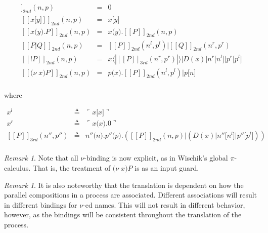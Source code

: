 \documentclass[]{amsart}
\newcommand{\ldb}{[\![}
\newcommand{\rdb}{]\!]}
\newcommand{\lliftb}{\langle\!|}
\newcommand{\rliftb}{|\!\rangle}
\newcommand{\lpquote}{\ulcorner}
\newcommand{\rpquote}{\urcorner}
\newcommand{\newkw}{\nu}
\newcommand{\id}[1]{\texttt{#1}}
\newcommand{\pzero}{\mathbin{0}}
\newcommand{\juxtap}{\mathbin{\id{|}}}
\newcommand{\concat}{\mathbin{\id{.}}}
\newcommand{\binpar}[2]{#1 \juxtap #2}
\newcommand{\outputp}[2]{#1 \id{[} #2 \id{]}}
\newcommand{\prefix}[3]{#1 \id{(} #2 \id{)} \concat #3}
\newcommand{\lift}[2]{#1 \lliftb #2 \rliftb}
\newcommand{\quotep}[1]{\lpquote #1 \rpquote}
\newcommand{\newp}[2]{\id{(}\newkw \; #1 \id{)} #2}
\newcommand{\meaningof}[1]{\ldb #1 \rdb}
\theoremstyle{definition}
\theoremstyle{remark}
\newtheorem{rem}[thm]{Remark}
\numberwithin{equation}{subsection}
\begin{document}
\begin{eqnarray*}
   	\meaningof{\pzero}_{2nd} (  n, p )
   		& = &
   		 \pzero \\
   	\meaningof{x \id{[} y \id{]}}_{2nd} (  n, p ) 
  		& = & 
  		x \id{[} y \id{]} \\
   	\meaningof{x \id{(} y \id{)} \concat P}_{2nd} (  n, p ) 
   		& = & 
 		x \id{(} y \id{)} \concat \meaningof{P}_{2nd} (  n, p ) \\
   	\meaningof{P \juxtap Q}_{2nd} (  n, p ) 
   		& = & 
 		\meaningof{P}_{2nd} ( n^{l}, p^{l} )
   			 \juxtap \meaningof{Q}_{2nd} ( n^{r}, p^{r} ) \\
   	\meaningof{\id{!} P}_{2nd} (  n, p )
   		& = & \binpar{\lift{x}{\meaningof{P}_{3rd}( n^{r}, p^{r} )}}
		             {\binpar{D(x)}{\binpar{\outputp{n^{r}}{n^{l}}}{\outputp{p^{r}}{p^{l}}}}} \\
   	\meaningof{\id{(}\nu \; x \id{)} P}_{2nd} (  n, p ) 
   		& = & 
 		\prefix{p}{x}{\binpar{\meaningof{P}_{2nd} ( n^{l}, p^{l} )}{\outputp{p}{n}}} \\
\end{eqnarray*}

where

\begin{eqnarray*}
	x^{l} & \triangleq & \quotep{\outputp{x}{x}} \\
	x^{r} & \triangleq & \quotep{\prefix{x}{x}{\pzero}} \\
	\meaningof{P}_{3rd}( n'', p'' ) 
		& \triangleq & 
			\prefix{n''}{n}{\prefix{p''}{p}{(\binpar{\meaningof{P}_{2nd}(  n, p )}
							        {(\binpar{D(x)}{\binpar{\outputp{n''}{n^{l}}}{\outputp{p''}{p^{l}}}})})}} \\
\end{eqnarray*}

\begin{rem}
	Note that all $\nu$-binding is now explicit, as in Wischik's global
	$\pi$-calculus. That is, the treatment of $\newp{x}{P}$ is as an input
	guard.
\end{rem}
	
\begin{rem}
	It is also noteworthy that the translation is dependent on how
	the parallel compositions in a process are
	associated. Different associations will result in different
	bindings for $\nu$-ed names. This will not result in different
	behavior, however, as the bindings will be consistent
	throughout the translation of the process.
\end{rem}
\end{document}

